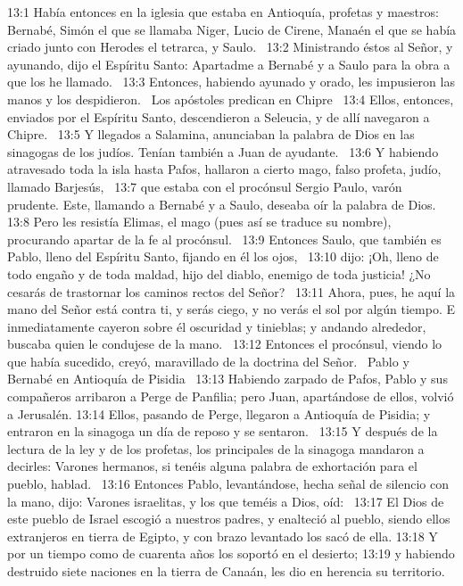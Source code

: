 13:1 Había entonces en la iglesia que estaba en Antioquía, profetas y maestros: Bernabé, Simón el que se llamaba Niger, Lucio de Cirene, Manaén el que se había criado junto con Herodes el tetrarca, y Saulo.  
13:2 Ministrando éstos al Señor, y ayunando, dijo el Espíritu Santo: Apartadme a Bernabé y a Saulo para la obra a que los he llamado.  
13:3 Entonces, habiendo ayunado y orado, les impusieron las manos y los despidieron.  
Los apóstoles predican en Chipre  
13:4 Ellos, entonces, enviados por el Espíritu Santo, descendieron a Seleucia, y de allí navegaron a Chipre.  
13:5 Y llegados a Salamina, anunciaban la palabra de Dios en las sinagogas de los judíos. Tenían también a Juan de ayudante.  
13:6 Y habiendo atravesado toda la isla hasta Pafos, hallaron a cierto mago, falso profeta, judío, llamado Barjesús,  
13:7 que estaba con el procónsul Sergio Paulo, varón prudente. Este, llamando a Bernabé y a Saulo, deseaba oír la palabra de Dios.  
13:8 Pero les resistía Elimas, el mago (pues así se traduce su nombre), procurando apartar de la fe al procónsul.  
13:9 Entonces Saulo, que también es Pablo, lleno del Espíritu Santo, fijando en él los ojos,  
13:10 dijo: ¡Oh, lleno de todo engaño y de toda maldad, hijo del diablo, enemigo de toda justicia! ¿No cesarás de trastornar los caminos rectos del Señor?  
13:11 Ahora, pues, he aquí la mano del Señor está contra ti, y serás ciego, y no verás el sol por algún tiempo. E inmediatamente cayeron sobre él oscuridad y tinieblas; y andando alrededor, buscaba quien le condujese de la mano.  
13:12 Entonces el procónsul, viendo lo que había sucedido, creyó, maravillado de la doctrina del Señor.  
Pablo y Bernabé en Antioquía de Pisidia  
13:13 Habiendo zarpado de Pafos, Pablo y sus compañeros arribaron a Perge de Panfilia; pero Juan, apartándose de ellos, volvió a Jerusalén. 
13:14 Ellos, pasando de Perge, llegaron a Antioquía de Pisidia; y entraron en la sinagoga un día de reposo y se sentaron.  
13:15 Y después de la lectura de la ley y de los profetas, los principales de la sinagoga mandaron a decirles: Varones hermanos, si tenéis alguna palabra de exhortación para el pueblo, hablad.  
13:16 Entonces Pablo, levantándose, hecha señal de silencio con la mano, dijo: Varones israelitas, y los que teméis a Dios, oíd:  
13:17 El Dios de este pueblo de Israel escogió a nuestros padres, y enalteció al pueblo, siendo ellos extranjeros en tierra de Egipto, y con brazo levantado los sacó de ella. 
13:18 Y por un tiempo como de cuarenta años los soportó en el desierto; 
13:19 y habiendo destruido siete naciones en la tierra de Canaán, les dio en herencia su territorio. 
